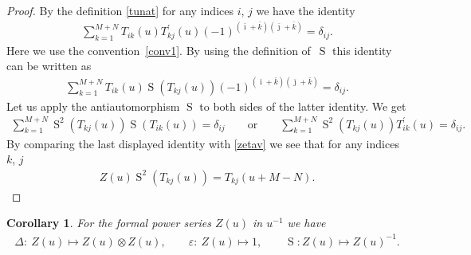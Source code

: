 \documentclass[pdftex]{sigma}
\numberwithin{equation}{section}
\newtheorem{Corollary}[Theorem]{Corollary}
\def\bi{{\bar\imath }}
\def\bj{{\bar\jmath }}
\def\bk{{\bar k }}
\def\De{\Delta}
\def\ep{\varepsilon}
\def\ot{\otimes}
\def\S{\operatorname{S}}
\def\TP{T^{\prime}}
\begin{document}
\begin{proof}By the definition \eqref{tunat} for any indices $i$, $j$
we have the identity
\begin{gather}\label{TTP}
\sum_{k=1}^{M+N} T_{ik}(u) \TP_{kj}(u)
{(-1)}^{( \bi + \bk )( \bj + \bk )}
=\delta_{ij} .
\end{gather}
Here we use the convention~\eqref{conv1}. By using the definition of~$\S$
this identity can be written as
\begin{gather*}
\sum_{k=1}^{M+N} T_{ik}(u) \S( T_{kj}(u))
{(-1)}^{( \bi + \bk )( \bj + \bk )}
=\delta_{ij} .
\end{gather*}
Let us apply the antiautomorphism $\S$ to both sides of
the latter identity. We get
\begin{gather*}
\sum_{k=1}^{M+N}
\S^{2}( T_{kj}(u)) \S( T_{ik}(u))=\delta_{ij}
\qquad\text{or}\qquad
\sum_{k=1}^{M+N}
\S^{2}( T_{kj}(u)) \TP_{ik}(u)=\delta_{ij} .
\end{gather*}
By comparing the last displayed identity with \eqref{zetav} we see that
for any indices $k$, $j$
\begin{gather*}
Z(u) \S^{2}( T_{kj}(u))=T_{kj}(u+M-N) .
\tag*{\qed}
\end{gather*}
\renewcommand{\qed}{}
\end{proof}

\begin{Corollary}
\label{DZ}
For the formal power series $Z(u)$ in $u^{-1}$ we have
\begin{gather}
\label{DeZu}
\De\colon \ Z(u)\mapsto Z(u)\ot Z(u) ,
\qquad
\ep\colon \ Z(u)\mapsto1 ,
\qquad
\S\colon Z(u)\mapsto Z(u)^{-1} .
\end{gather}
\end{Corollary}
\end{document}
